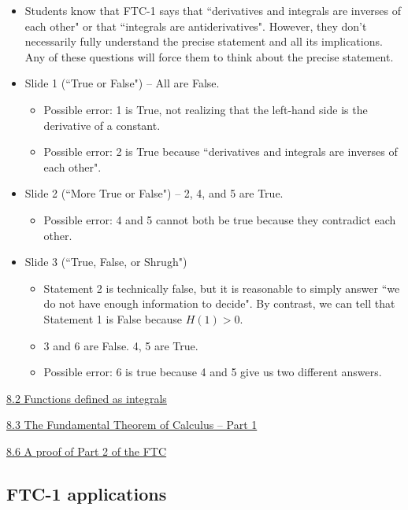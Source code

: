 \documentclass[11pt]{article}
\newcommand{\nl}{\hfill \vspace{-1.1\baselineskip}} %
\newcommand{\vii}{\hspace{8mm} \href{https://www.youtube.com/watch?v=BQIiCjoFILs&list=PLlwePzQY_wW_8-sITAbG_GU2JgiuwXkDN&index=2}{8.2 Functions defined as integrals}}
\newcommand{\viii}{\hspace{8mm} \href{https://www.youtube.com/watch?v=JeKCipoy8bc&list=PLlwePzQY_wW_8-sITAbG_GU2JgiuwXkDN&index=3}{8.3 The Fundamental Theorem of Calculus -- Part 1}}
\newcommand{\vvi}{\hspace{8mm} \href{https://www.youtube.com/watch?v=58VnS2eczss&list=PLlwePzQY_wW_8-sITAbG_GU2JgiuwXkDN&index=6}{8.6 A proof of Part 2 of the FTC}}
\begin{document}
\begin{comments}
\nl
	\begin{itemize}
		\item Students know that FTC-1 says that ``derivatives and integrals are inverses of each other" or that ``integrals are antiderivatives".   However, they don't necessarily fully understand the precise statement and all its implications.  Any of these questions will force them to think about the precise statement.
		\item Slide 1 (``True or False")  -- All are False.
			\begin{itemize}	
				\item Possible error:  1 is True, not realizing that the left-hand side is the derivative of a constant.
				\item Possible error: 2 is True because ``derivatives and integrals are inverses of each other".
			\end{itemize}
		\item Slide 2 (``More True or False") -- 2, 4, and 5 are True.
			\begin{itemize}
				\item  Possible error: 4 and 5 cannot both be true because they contradict each other.
			\end{itemize}
		\item Slide 3 (``True, False, or Shrugh")
			\begin{itemize}
				\item Statement 2 is technically false, but it is reasonable to simply answer ``we do not have enough information to decide".  By contrast, we can tell that Statement 1 is False because $H(1)>0$.
				\item 3 and 6 are False.  4, 5 are True.
				\item Possible error: 6 is true because 4 and 5 give us two different answers.
			\end{itemize}
	\end{itemize}
\end{comments}

\begin{videos}
\vii

\viii

\vvi
\end{videos}

\newpage
\subsection{FTC-1 applications}
\end{document}
